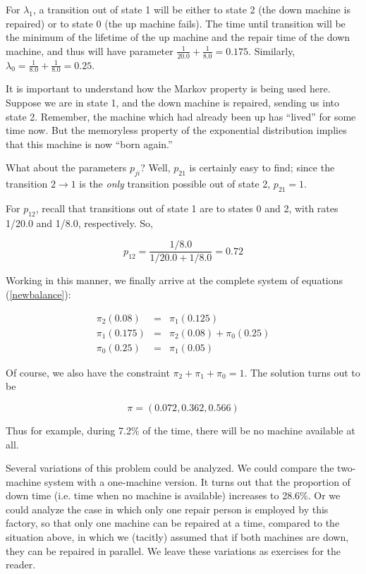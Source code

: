 For $\lambda_{1}$, a transition out of state 1 will be either to state
2 (the down machine is repaired) or to state 0 (the up machine fails).
The time until transition will be the minimum of the lifetime of the up
machine and the repair time of the down machine, and thus will have
parameter $\frac{1}{20.0}+\frac{1}{8.0}=0.175$.  Similarly, $\lambda
_{0}=\frac{1}{8.0}+\frac{1}{8.0}=0.25$.

It is important to understand how the Markov property is being used
here. Suppose we are in state 1, and the down machine is repaired,
sending us into state 2.  Remember, the machine which had already been
up has ``lived'' for some time now. But the memoryless property of the
exponential distribution implies that this machine is now ``born
again.''

What about the parameters $p_{ji}$? Well, $p_{21}$ is certainly easy to
find; since the transition $2\rightarrow 1$ is the \textit{only}
transition possible out of state 2, $p_{21} = 1$.

For $p_{12}$, recall that transitions out of state 1 are to states 0 and
2, with rates 1/20.0 and 1/8.0, respectively.  So,

\begin{equation}
p_{12} = \frac{1/8.0}{1/20.0+1/8.0} = 0.72
\end{equation}

Working in this manner, we finally arrive at the complete system of equations
(\ref{newbalance}):

\begin{eqnarray}
\pi_{2}(0.08) & = & \pi_{1}(0.125)\\
\pi_{1}(0.175) & = & \pi_{2}(0.08)+\pi_{0}(0.25)\\
\pi_{0}(0.25) & = & \pi_{1}(0.05)
\end{eqnarray} 

Of course, we also have the constraint $\pi_{2}+\pi_{1}+\pi_{0}=1$.
The solution turns out to be

\begin{equation}
\pi =(0.072,0.362,0.566)
\end{equation}  

Thus for example, during 7.2\% of the time, there will be no machine available
at all.

Several variations of this problem could be analyzed. We could compare
the two-machine system with a one-machine version. It turns out that the
proportion of down time (i.e. time when no machine is available)
increases to 28.6\%. Or we could analyze the case in which only one
repair person is employed by this factory, so that only one machine can
be repaired at a time, compared to the situation above, in which we
(tacitly) assumed that if both machines are down, they can be repaired
in parallel. We leave these variations as exercises for the reader.

